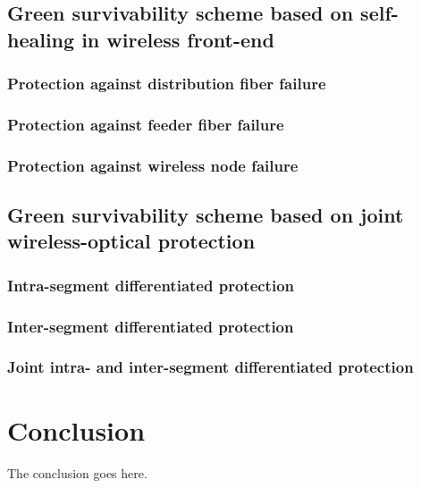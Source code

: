 \documentclass[conference,compsoc]{IEEEtran}
\begin{document}
%
\subsection{Green survivability scheme based on self-healing in wireless front-end}

\subsubsection{Protection against distribution fiber failure}
\subsubsection{Protection against feeder fiber failure}
\subsubsection{Protection against wireless node failure}


%
\subsection{Green survivability scheme based on joint wireless-optical
protection}

\subsubsection{Intra-segment differentiated protection}
\subsubsection{Inter-segment differentiated protection}
\subsubsection{Joint intra- and inter-segment differentiated protection}



\section{Conclusion}
The conclusion goes here.




\end{document}
